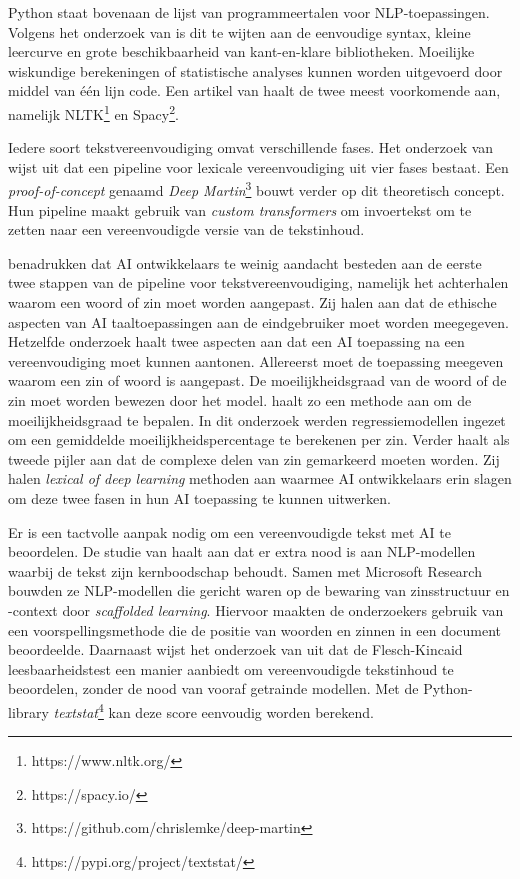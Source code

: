 Python staat bovenaan de lijst van programmeertalen voor NLP-toepassingen. Volgens het onderzoek van \textcite{Thangarajah2019} is dit te wijten aan de eenvoudige syntax, kleine leercurve en grote beschikbaarheid van kant-en-klare bibliotheken. Moeilijke wiskundige berekeningen of statistische analyses kunnen worden uitgevoerd door middel van één lijn code. Een artikel van \textcite{Malik2022} haalt de twee meest voorkomende aan, namelijk NLTK\footnote{https://www.nltk.org/} en Spacy\footnote{https://spacy.io/}.

Iedere soort tekstvereenvoudiging omvat verschillende fases. Het onderzoek van \textcite{Shardlow2014} wijst uit dat een pipeline voor lexicale vereenvoudiging uit vier fases bestaat. Een \textit{proof-of-concept} genaamd \textit{Deep Martin}\footnote{https://github.com/chrislemke/deep-martin} bouwt verder op dit theoretisch concept. Hun pipeline maakt gebruik van \textit{custom transformers} om invoertekst om te zetten naar een vereenvoudigde versie van de tekstinhoud.

\textcite{Garbacea2021} benadrukken dat AI ontwikkelaars te weinig aandacht besteden aan de eerste twee stappen van de pipeline voor tekstvereenvoudiging, namelijk het achterhalen waarom een woord of zin moet worden aangepast. Zij halen aan dat de ethische aspecten van AI taaltoepassingen aan de eindgebruiker moet worden meegegeven. Hetzelfde onderzoek haalt twee aspecten aan dat een AI toepassing na een vereenvoudiging moet kunnen aantonen. Allereerst moet de toepassing meegeven waarom een zin of woord is aangepast. De moeilijkheidsgraad van de woord of de zin moet worden bewezen door het model. \textcite{Iavarone2021} haalt zo een methode aan om de moeilijkheidsgraad te bepalen. In dit onderzoek werden regressiemodellen ingezet om een gemiddelde moeilijkheidspercentage te berekenen per zin. Verder haalt \textcite{Garbacea2021} als tweede pijler aan dat de complexe delen van zin gemarkeerd moeten worden. Zij halen \textit{lexical of deep learning} methoden aan waarmee AI ontwikkelaars erin slagen om deze twee fasen in hun AI toepassing te kunnen uitwerken.

Er is een tactvolle aanpak nodig om een vereenvoudigde tekst met AI te beoordelen. De studie van \textcite{Swayamdipta2019} haalt aan dat er extra nood is aan NLP-modellen waarbij de tekst zijn kernboodschap behoudt. Samen met Microsoft Research bouwden ze NLP-modellen die gericht waren op de bewaring van zinsstructuur en -context door \emph{scaffolded learning}. Hiervoor maakten de onderzoekers gebruik van een voorspellingsmethode die de positie van woorden en zinnen in een document beoordeelde. Daarnaast wijst het onderzoek van \textcite{Readable2021} uit dat de Flesch-Kincaid leesbaarheidstest een manier aanbiedt om vereenvoudigde tekstinhoud te beoordelen, zonder de nood van vooraf getrainde modellen. Met de Python-library \textit{textstat}\footnote{https://pypi.org/project/textstat/} kan deze score eenvoudig worden berekend.

